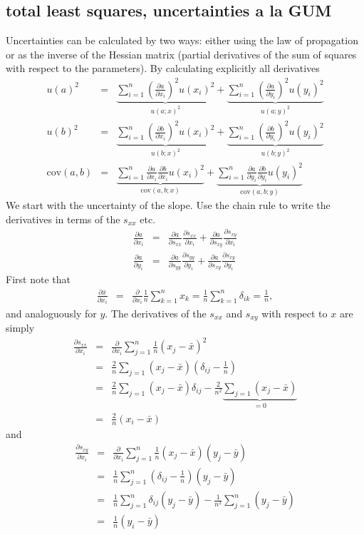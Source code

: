 \documentclass[a4paper,11pt,onepage]{article}
\newcommand{\cov}{\mathrm{cov}}
\newcommand{\ddp}[2]{\frac{\partial #1}{\partial #2}}
\begin{document}
\subsection{total least squares, uncertainties a la GUM}
Uncertainties can be calculated by two ways: either using the law of propagation or as the inverse of the Hessian matrix (partial derivatives of the sum of squares with respect to the parameters).
By calculating explicitly all derivatives
\begin{eqnarray}
 u(a)^2 &=& \underbrace{\sum_{i=1}^n \left(\ddp{a}{x_i}\right)^2 u(x_i)^2}_{u(a;x)^2} + \underbrace{\sum_{i=1}^n \left(\ddp{a}{y_i}\right)^2 u(y_i)^2}_{u(a;y)^2} \\
 u(b)^2 &=& \underbrace{\sum_{i=1}^n \left(\ddp{b}{x_i}\right)^2 u(x_i)^2}_{u(b;x)^2} + \underbrace{\sum_{i=1}^n \left(\ddp{b}{y_i}\right)^2 u(y_i)^2}_{u(b;y)^2} \\
 \cov(a,b) &=& \underbrace{ \sum_{i=1}^n \ddp{a}{x_i} \ddp{b}{x_i} u(x_i)^2 }_{\cov(a,b;x)} + \underbrace{\sum_{i=1}^n \ddp{a}{y_i} \ddp{b}{y_i} u(y_i)^2}_{\cov(a,b;y)}
 \end{eqnarray}
We start with the uncertainty of the slope. Use the chain rule to write the derivatives in terms of the $s_{xx}$ etc. 
\begin{eqnarray*}
 \ddp{a}{x_i} &=& \ddp{a}{s_{xx}} \ddp{s_{xx}}{x_i} + \ddp{a}{s_{xy}} \ddp{s_{xy}}{x_i} \\
 \ddp{a}{y_i} &=& \ddp{a}{s_{yy}} \ddp{s_{yy}}{y_i} + \ddp{a}{s_{xy}} \ddp{s_{xy}}{y_i} 
 \end{eqnarray*}
First note that 
\begin{eqnarray*}
 \ddp{\bar x}{x_i} &=& \ddp{}{x_i} \frac1n \sum_{k=1}^n x_k = \frac1n \sum_{k=1}^n \delta_{ik} = \frac1n,
\end{eqnarray*}
and analoguously for $y$.
The derivatives of the $s_{xx}$ and $s_{xy}$ with respect to $x$ are simply
\begin{eqnarray*}
 \ddp{s_{xx}}{x_i} &=& \ddp{}{x_i} \sum_{j=1}^n \frac1n \left(x_j - \bar x \right)^2 \\
 &=& \frac2n \sum_{j=1} \left( x_j - \bar x \right) \left( \delta_{ij} - \frac1n \right) \\
 &=& \frac2n \sum_{j=1} \left( x_j - \bar x \right)\delta_{ij}  - \frac{2}{n^2} \underbrace{\sum_{j=1} \left( x_j -\bar x \right) }_{=0} \\
 &=& \frac2n  \left( x_i - \bar x \right)
\end{eqnarray*}
and 
\begin{eqnarray*}
 \ddp{s_{xy}}{x_i} &=& \ddp{}{x_i} \sum_{j=1}^n \frac1n \left(x_j - \bar x \right) \left( y_j - \bar y \right) \\
&=& \frac1n \sum_{j=1}^n \left( \delta_{ij} - \frac1n \right) \left(y_j - \bar y \right) \\
&=& \frac1n \sum_{j=1}^n \delta_{ij} \left(y_j - \bar y \right) - \frac1{n^2} \sum_{j=1}^n \left(y_j - \bar y \right)	\\
&=& \frac1n \left(y_i - \bar y \right)
\end{eqnarray*}
\end{document}
